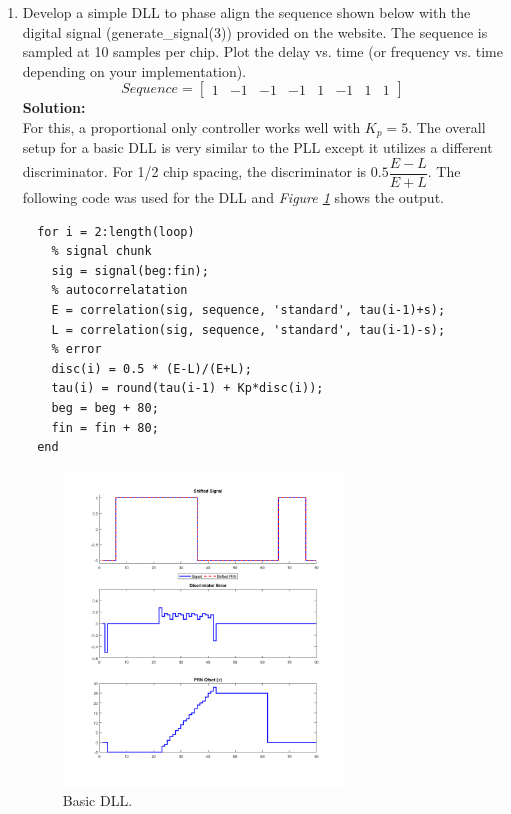 \documentclass[10pt]{article}
\newcommand{\solution}{\textbf{Solution: \\}}
\begin{document}
\begin{enumerate}[label=\textbf{\arabic*.}]
  \item Develop a simple DLL to phase align the sequence shown below with the 
  digital signal (generate\_signal(3)) provided on the website. The sequence is 
  sampled at 10 samples per chip. Plot the delay vs. time (or frequency vs. time 
  depending on your implementation).
  \begin{equation*}
    Sequence = \begin{bmatrix} 1 & -1 & -1 & -1 & 1 & -1 & 1 & 1 \end{bmatrix}
  \end{equation*} 
  \solution
  For this, a proportional only controller works well with $K_p = 5$. The 
  overall setup for a basic DLL is very similar to the PLL except it utilizes 
  a different discriminator. For 1/2 chip spacing, the discriminator is 
  $0.5\dfrac{E-L}{E+L}$. The following code was used for the DLL and 
  \emph{Figure \ref{fig:7}} shows the output.
  \begin{lstlisting}
  for i = 2:length(loop)
    % signal chunk
    sig = signal(beg:fin);
    % autocorrelatation
    E = correlation(sig, sequence, 'standard', tau(i-1)+s);
    L = correlation(sig, sequence, 'standard', tau(i-1)-s);
    % error
    disc(i) = 0.5 * (E-L)/(E+L);
    tau(i) = round(tau(i-1) + Kp*disc(i));
    beg = beg + 80;
    fin = fin + 80;
  end
  \end{lstlisting}
  \begin{figure}[H]
    \centering
    \includegraphics[width=0.7\textwidth]{p4_dll.png}
    \caption{Basic DLL.}
    \label{fig:7}
  \end{figure}
  \vspace{12pt}
  

\end{enumerate}
\end{document}
